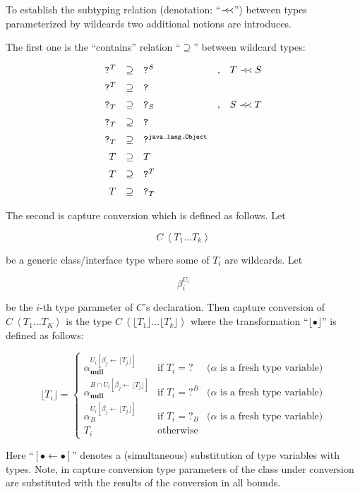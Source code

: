 \documentclass{article}
\newcommand{\precprec}{\prec\mathrel{\mkern-5mu}\prec}
\newcommand{\grc}[2]{{#1}\,\left<{#2}\right>}
\newcommand{\java}[1]{\texttt{#1}}
\newcommand{\primi}[1]{\mathbf{#1}}
\newcommand{\cc}[1]{\lfloor{#1}\rfloor}
\begin{document}
To establish the subtyping relation (denotation: ``$\precprec$'') between types parameterized by wildcards two additional
notions are introduces.

The first one is the ``contains'' relation ``$\supseteq$'' between wildcard types:

\[
\begin{array}{rclcl}
  \java{?}^T&\supseteq&\java{?}^S&,&T\precprec S \\[2mm]
  \java{?}^T&\supseteq&\java{?}&& \\[2mm]
  \java{?}_T&\supseteq&\java{?}_S&,&S\precprec T\\[2mm]
  \java{?}_T&\supseteq&\java{?}&& \\[2mm]
  \java{?}_T&\supseteq&\java{?}^\java{java.lang.Object}&& \\[2mm]
  T&\supseteq& T&&\\[2mm]
  T&\supseteq&\java{?}^T&&\\[2mm]
  T&\supseteq&\java{?}_T&&
\end{array}
\]

The second is capture conversion which is defined as follows. Let

\[
\grc{C}{T_1\dots T_k}
\]

be a generic class/interface type where some of $T_i$ are wildcards. Let

\[
\beta_i^{U_i}
\]

be the $i$-th type parameter of $C$'s declaration. Then capture conversion of
$\grc{C}{T_1\dots T_K}$ is the type $\grc{C}{\cc{T_1}\dots \cc{T_k}}$ where the transformation
``$\cc{\bullet}$'' is defined as follows:

\[
\cc{T_i}=\left\{
\begin{array}{lll}  
  \alpha^{U_i[\beta_j\gets \cc{T_j}]}_\primi{null}      &\mbox{if }        T_i=\java{?}  &\mbox{($\alpha$ is a fresh type variable)}\\[5mm]
  \alpha^{B\cap U_i[\beta_j\gets \cc{T_j}]}_\primi{null} &\mbox{if }        T_i=\java{?}^B &\mbox{($\alpha$ is a fresh type variable)}\\[5mm]
  \alpha^{U_i[\beta_j\gets \cc{T_j}]}_B               &\mbox{if }        T_i=\java{?}_B &\mbox{($\alpha$ is a fresh type variable)}\\[5mm]
  T_i                                           &\mbox{otherwise}  & 
\end{array}\right.
\]

Here ``$[\bullet\gets\bullet]$'' denotes a (simultaneous) substitution of type variables with types. Note, in capture conversion
type parameters of the class under conversion are substituted with the results of the conversion in all bounds.
\end{document}

